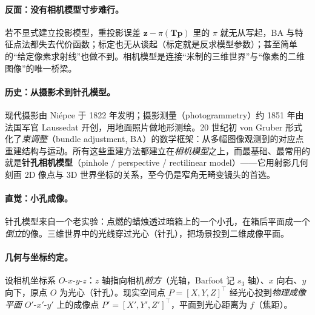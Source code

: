 \paragraph{反面：没有相机模型寸步难行。}
若不显式建立投影模型，重投影误差 $\mathbf{z}-\pi(\mathbf{T}\mathbf{p})$ 里的 $\pi$ 就无从写起，BA 与特征点法都失去代价函数；标定也无从谈起（标定就是反求模型参数）；甚至简单的“给定像素求射线”也做不到。相机模型是连接“米制的三维世界”与“像素的二维图像”的唯一桥梁。

\paragraph{历史：从摄影术到针孔模型。}
现代摄影由 Niépce 于 1822 年发明；摄影测量（photogrammetry）约 1851 年由法国军官 Laussedat 开创，用地面照片做地形测绘\cite{carlone2026handbook}。20 世纪初 von Gruber 形式化了\emph{束调整}（bundle adjustment, BA）的数学框架：从多幅图像观测到的对应点重建结构与运动。所有这些重建方法都建立在\emph{相机模型}之上，而最基础、最常用的就是\textbf{针孔相机模型}（pinhole / perspective / rectilinear model）——它用射影几何刻画 2D 像点与 3D 世界坐标的关系，至今仍是窄角无畸变镜头的首选\cite{carlone2026handbook}。

\paragraph{直觉：小孔成像。}
针孔模型来自一个老实验\cite{gaoxiang2019slam14}：点燃的蜡烛透过暗箱上的一个小孔，在箱后平面成一个\emph{倒立}的像。三维世界中的光线穿过光心（针孔），把场景投到二维成像平面。

\paragraph{几何与坐标约定。}
设相机坐标系 $O\text{-}x\text{-}y\text{-}z$：$z$ 轴指向相机\emph{前方}（光轴，Barfoot 记 $s_3$ 轴\cite{barfoot2024state}）、$x$ 向右、$y$ 向下，原点 $O$ 为光心（针孔）。现实空间点 $P=[X,Y,Z]^\top$ 经光心投到\emph{物理成像平面} $O'\text{-}x'\text{-}y'$ 上的成像点 $P'=[X',Y',Z']^\top$，平面到光心距离为 $f$（焦距）。

